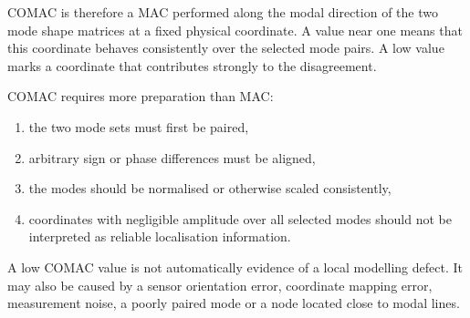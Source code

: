 COMAC is therefore a MAC performed along the modal direction of the two mode
shape matrices at a fixed physical coordinate. A value near one means that this
coordinate behaves consistently over the selected mode pairs. A low value marks
a coordinate that contributes strongly to the disagreement.

COMAC requires more preparation than MAC:

\begin{enumerate}
    \item the two mode sets must first be paired,
    \item arbitrary sign or phase differences must be aligned,
    \item the modes should be normalised or otherwise scaled consistently,
    \item coordinates with negligible amplitude over all selected modes should
          not be interpreted as reliable localisation information.
\end{enumerate}

A low COMAC value is not automatically evidence of a local modelling defect. It
may also be caused by a sensor orientation error, coordinate mapping error,
measurement noise, a poorly paired mode or a node located close to modal lines.

